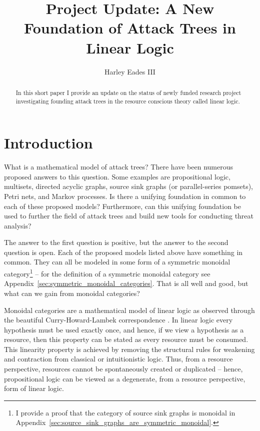 \documentclass{llncs}
\date{}
\begin{document}

\title{Project Update: A New Foundation of Attack Trees in Linear Logic}

\author{Harley Eades III}

\maketitle 

\begin{abstract}
  In this short paper I provide an update on the status of newly
  funded research project investigating founding attack trees in the
  resource conscious theory called linear logic.  
\end{abstract}

\section{Introduction}
\label{sec:introduction}
What is a mathematical model of attack trees?  There have been
numerous proposed answers to this question.  Some examples are
propositional logic, multisets, directed acyclic graphs, source sink
graphs (or parallel-series pomsets), Petri nets, and Markov processes.
Is there a unifying foundation in common to each of these proposed
models?  Furthermore, can this unifying foundation be used to further
the field of attack trees and build new tools for conducting threat
analysis?

The answer to the first question is positive, but the answer to the
second question is open.  Each of the proposed models listed above
have something in common.  They can all be modeled in some form of a
symmetric monoidal category\footnote{I provide a proof that the
  category of source sink graphs is monoidal in
  Appendix~\ref{sec:source_sink_graphs_are_symmetric_monoidal}.}
\cite{Tzouvaras:1998,Brown:1991,Fiore:2013,FrancescoAlbasini2010} --
for the definition of a symmetric monoidal category see
Appendix~\ref{sec:symmetric_monoidal_categories}.  That is all well
and good, but what can we gain from monoidal categories?

Monoidal categories are a mathematical model of linear logic as
observed through the beautiful Curry-Howard-Lambek correspondence
\cite{Mellies:2009}.  In linear logic every hypothesis must be used
exactly once, and hence, if we view a hypothesis as a resource, then
this property can be stated as every resource must be consumed.  This
linearity property is achieved by removing the structural rules for
weakening and contraction from classical or intuitionistic logic.
Thus, from a resource perspective, resources cannot be spontaneously
created or duplicated -- hence, propositional logic can be viewed as a
degenerate, from a resource perspective, form of linear logic.
\end{document}
